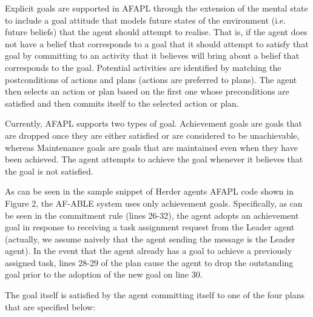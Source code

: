 \documentclass[preprint]{sigplanconf} %
\begin{document}
Explicit goals are supported in AFAPL through the extension of the mental state
to include a goal attitude that models future states of the environment (i.e.
future beliefs) that the agent should attempt to realise. That is, if the agent
does not have a belief that corresponds to a goal that it should attempt to
satisfy that goal by committing to an activity that it believes will bring
about a belief that corresponds to the goal. Potential activities are
identified by matching the postconditions of actions and plans (actions are
preferred to plans). The agent then selects an action or plan based on the
first one whose preconditions are satisfied and then commits itself to the
selected action or plan.

Currently, AFAPL supports two types of goal. Achievement goals are goals
that are dropped once they are either satisfied or are considered to be
unachievable, whereas Maintenance goals are goals that are maintained even
when they have been achieved. The agent attempts to achieve the goal
whenever it believes that the goal is not satisfied.

As can be seen in the sample snippet of Herder agents AFAPL code shown in
Figure 2, the AF-ABLE system uses only achievement goals. Specifically, as
can be seen in the commitment rule (lines 26-32), the agent adopts an
achievement goal in response to receiving a task assignment request from
the Leader agent (actually, we assume naively that the agent sending the
message is the Leader agent). In the event that the agent already has a
goal to achieve a previously assigned task, lines 28-29 of the plan cause
the agent to drop the outstanding goal prior to the adoption of the new
goal on line 30.

The goal itself is satisfied by the agent committing itself to one of the four
plans that are specified below:
\end{document}
